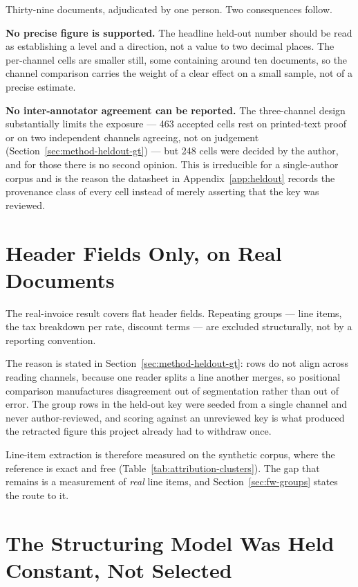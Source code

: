 Thirty-nine documents, adjudicated by one person. Two consequences follow.

\textbf{No precise figure is supported.} The headline held-out number should be read as
establishing a level and a direction, not a value to two decimal places. The per-channel cells
are smaller still, some containing around ten documents, so the channel comparison carries the
weight of a clear effect on a small sample, not of a precise estimate.

\textbf{No inter-annotator agreement can be reported.} The three-channel design substantially
limits the exposure --- 463 accepted cells rest on printed-text proof or on two independent
channels agreeing, not on judgement (Section~\ref{sec:method-heldout-gt}) --- but 248 cells were
decided by the author, and for those there is no second opinion. This is irreducible for a
single-author corpus and is the reason the datasheet in Appendix~\ref{app:heldout} records the
provenance class of every cell instead of merely asserting that the key was reviewed.

\section{Header Fields Only, on Real Documents}
\label{sec:lim-groups}

The real-invoice result covers flat header fields. Repeating groups --- line items, the tax
breakdown per rate, discount terms --- are excluded structurally, not by a reporting convention.

The reason is stated in Section~\ref{sec:method-heldout-gt}: rows do not align across reading channels,
because one reader splits a line another merges, so positional comparison manufactures
disagreement out of segmentation rather than out of error. The group rows in the held-out key were
seeded from a single channel and never author-reviewed, and scoring against an unreviewed key is
what produced the retracted figure this project already had to withdraw once.

Line-item extraction is therefore measured on the synthetic corpus, where the reference is exact
and free (Table~\ref{tab:attribution-clusters}). The gap that remains is a measurement of
\emph{real} line items, and Section~\ref{sec:fw-groups} states the route to it.

\section{The Structuring Model Was Held Constant, Not Selected}
\label{sec:lim-structurer-selection}

